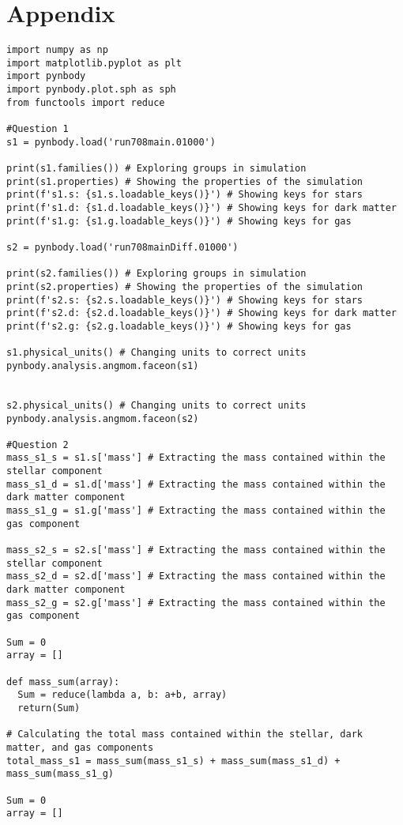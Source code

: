 \documentclass[12pt, a4paper]{article}
\begin{document}
\section{Appendix}
\begin{lstlisting}[language=iPython]
import numpy as np
import matplotlib.pyplot as plt
import pynbody
import pynbody.plot.sph as sph
from functools import reduce
  
#Question 1
s1 = pynbody.load('run708main.01000')
  
print(s1.families()) # Exploring groups in simulation
print(s1.properties) # Showing the properties of the simulation
print(f's1.s: {s1.s.loadable_keys()}') # Showing keys for stars
print(f's1.d: {s1.d.loadable_keys()}') # Showing keys for dark matter
print(f's1.g: {s1.g.loadable_keys()}') # Showing keys for gas
  
s2 = pynbody.load('run708mainDiff.01000')
  
print(s2.families()) # Exploring groups in simulation
print(s2.properties) # Showing the properties of the simulation
print(f's2.s: {s2.s.loadable_keys()}') # Showing keys for stars
print(f's2.d: {s2.d.loadable_keys()}') # Showing keys for dark matter
print(f's2.g: {s2.g.loadable_keys()}') # Showing keys for gas
  
s1.physical_units() # Changing units to correct units
pynbody.analysis.angmom.faceon(s1)
  
  
s2.physical_units() # Changing units to correct units
pynbody.analysis.angmom.faceon(s2)
  
#Question 2
mass_s1_s = s1.s['mass'] # Extracting the mass contained within the stellar component
mass_s1_d = s1.d['mass'] # Extracting the mass contained within the dark matter component
mass_s1_g = s1.g['mass'] # Extracting the mass contained within the gas component
  
mass_s2_s = s2.s['mass'] # Extracting the mass contained within the stellar component
mass_s2_d = s2.d['mass'] # Extracting the mass contained within the dark matter component
mass_s2_g = s2.g['mass'] # Extracting the mass contained within the gas component
  
Sum = 0
array = []
  
def mass_sum(array):
  Sum = reduce(lambda a, b: a+b, array)
  return(Sum)
  
# Calculating the total mass contained within the stellar, dark matter, and gas components
total_mass_s1 = mass_sum(mass_s1_s) + mass_sum(mass_s1_d) + mass_sum(mass_s1_g)
  
Sum = 0
array = []
  

\end{lstlisting}
\end{document}
